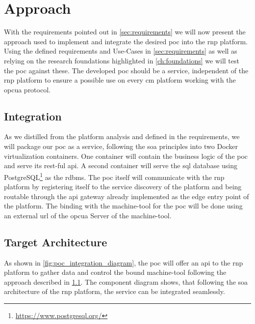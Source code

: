 \documentclass[
a4paper,
twoside,
headsepline,
cleardoublepage=empty,
parskip=half,
draft=false
]{scrbook}
\begin{document}
		\section{Approach} \label{sec:approach}

			With the requirements pointed out in \cref{sec:requirements} we will now present the approach used to implement and integrate the desired \gls{poc} into the \gls{rnp} platform. Using the defined requirements and Use-Cases in \cref{sec:requirements} as well as relying on the research foundations highlighted in \cref{ch:foundations} we will test the \gls{poc} against these. The developed \gls{poc} should be a service, independent of the \gls{rnp} platform to ensure a possible use on every \gls{cm} platform working with the \gls{opcua} protocol.

			\subsection{Integration} \label{subsec:integration}

				As we distilled from the platform analysis and defined in the requirements, we will package our \gls{poc} as a service, following the \gls{soa} principles into two Docker virtualization containers. One container will contain the business logic of the \gls{poc} and serve its \gls{rest}-ful \gls{api}. A second container will serve the \gls{sql} database using PostgreSQL\footnote{\url{https://www.postgresql.org/}} as the \gls{rdbms}.
				The \gls{poc} itself will communicate with the \gls{rnp} platform by registering itself to the service discovery of the platform and being routable through the \gls{api} gateway already implemented as the edge entry point of the platform.
				The binding with the machine-tool for the \gls{poc} will be done using an external \gls{url} of the \gls{opcua} Server of the machine-tool.

			\subsection{Target Architecture} \label{subsec:target_architecture}

				As shown in \cref{fig:poc_integration_diagram}, the \gls{poc} will offer an \gls{api} to the \gls{rnp} platform to gather data and control the bound machine-tool following the approach described in \cref{subsec:integration}. The component diagram shows, that following the \gls{soa} architecture of the \gls{rnp} platform, the service can be integrated
				seamlessly.
\end{document}
